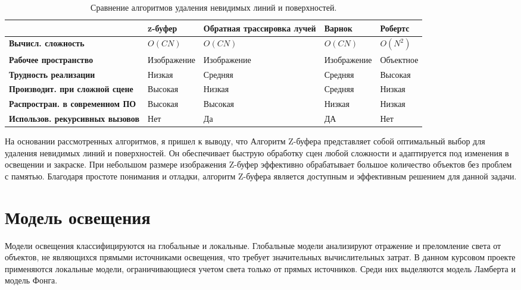\begin{table}[h!]
	\centering
	\caption{\raggedleft Сравнение алгоритмов удаления невидимых линий и поверхностей.}\label{table:1}
	\begin{tabularx}{\textwidth}{|X|X|X|X|X|}
		\hline
		& \textbf{z-буфер} & \textbf{Обратная трассировка лучей} & \textbf{Варнок} & \textbf{Робертс} \\
		\hline
		\textbf{Вычисл. сложность} & $O(CN)$ & $O(CN)$ & $O(CN)$ & $O(N^2)$ \\
		\hline
		\textbf{Рабочее пространство} & Изображение & Изображение & Изображение & Объектное \\
		\hline
		\textbf{Трудность \newline реализации} & Низкая & Средняя & Средняя & Высокая \\
		\hline
		\textbf{Производит. при сложной сцене} & Высокая & Низкая & Средняя & Низкая \\
		\hline
		\textbf{Распростран. в современном ПО} & Высокая & Высокая & Низкая & Низкая \\
		\hline
		\textbf{Использов. рекурсивных вызовов} & Нет & Да & ДА & Нет \\
		\hline
	\end{tabularx}
\end{table}





На основании рассмотренных алгоритмов, я пришел к выводу, что  Алгоритм Z-буфера представляет собой оптимальный выбор для удаления невидимых линий и поверхностей. Он обеспечивает быструю обработку сцен любой сложности и адаптируется под изменения в освещении и закраске. При небольшом размере изображения Z-буфер эффективно обрабатывает большое количество объектов без проблем с памятью. Благодаря простоте понимания и отладки, алгоритм Z-буфера является доступным и эффективным решением для данной задачи.


\section{Модель освещения}

Модели освещения классифицируются на глобальные и локальные. Глобальные модели анализируют отражение и преломление света от объектов, не являющихся прямыми источниками освещения, что требует значительных вычислительных затрат. В данном курсовом проекте применяются локальные модели, ограничивающиеся учетом света только от прямых источников. Среди них выделяются модель Ламберта и модель Фонга.




